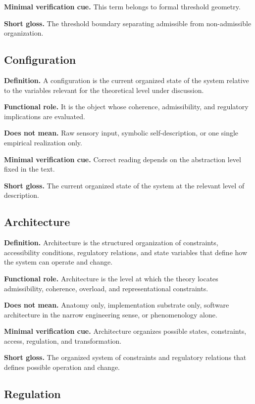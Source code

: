 \documentclass[11pt,a4paper]{article}
\begin{document}
	\textbf{Minimal verification cue.} This term belongs to formal threshold geometry.
	
	\textbf{Short gloss.} The threshold boundary separating admissible from non-admissible organization.
	
	\subsection{Configuration}
	
	\textbf{Definition.} A configuration is the current organized state of the system relative to the variables relevant for the theoretical level under discussion.
	
	\textbf{Functional role.} It is the object whose coherence, admissibility, and regulatory implications are evaluated.
	
	\textbf{Does not mean.} Raw sensory input, symbolic self-description, or one single empirical realization only.
	
	\textbf{Minimal verification cue.} Correct reading depends on the abstraction level fixed in the text.
	
	\textbf{Short gloss.} The current organized state of the system at the relevant level of description.
	
	\subsection{Architecture}
	
	\textbf{Definition.} Architecture is the structured organization of constraints, accessibility conditions, regulatory relations, and state variables that define how the system can operate and change.
	
	\textbf{Functional role.} Architecture is the level at which the theory locates admissibility, coherence, overload, and representational constraints.
	
	\textbf{Does not mean.} Anatomy only, implementation substrate only, software architecture in the narrow engineering sense, or phenomenology alone.
	
	\textbf{Minimal verification cue.} Architecture organizes possible states, constraints, access, regulation, and transformation.
	
	\textbf{Short gloss.} The organized system of constraints and regulatory relations that defines possible operation and change.
	
	\subsection{Regulation}
	
\end{document}
